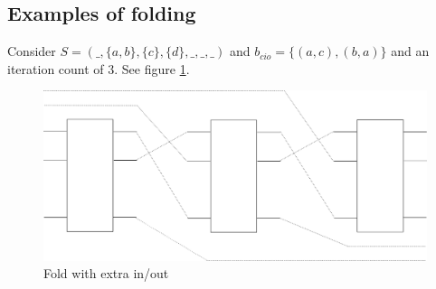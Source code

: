

\subsection{Examples of folding} %
\label{sub:examples_of_folding}
\begin{example}\label{exmpl:fold_example_with_three_mixed_in_out}
  Consider $S=(\_,\{a,b\},\{c\},\{d\},\_,\_,\_)$ and $b_{cio}=\{(a,c),(b,a)\}$
  and an iteration count of $3$. See figure
  \ref{fig:Fold_with_extra_in_out}.
\end{example}
\begin{figure}[htbp]
  \centering
    \includegraphics[scale=.5]{diagrams/FoldThreePlusInOut.png}
  \caption{Fold with extra in/out}
  \label{fig:Fold_with_extra_in_out}
\end{figure}

